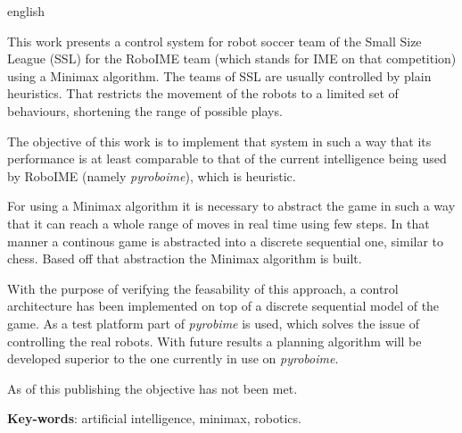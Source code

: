 \begin{resumo}[Abstract]
  \begin{otherlanguage*}{english}

    This work presents a control system for robot soccer team of the Small Size
    League (SSL) for the RoboIME team (which stands for IME on that competition)
    using a Minimax algorithm. The teams of SSL are usually controlled by plain
    heuristics. That restricts the movement of the robots to a limited set of
    behaviours, shortening the range of possible plays.

    The objective of this work is to implement that system in such a way that
    its performance is at least comparable to that of the current intelligence
    being used by RoboIME (namely \textit{pyroboime}), which is heuristic.

    For using a Minimax algorithm it is necessary to abstract the game in such a
    way that it can reach a whole range of moves in real time using few steps.
    In that manner a continous game is abstracted into a discrete sequential
    one, similar to chess. Based off that abstraction the Minimax algorithm is
    built.

    With the purpose of verifying the feasability of this approach, a control
    architecture has been implemented on top of a discrete sequential model of
    the game. As a test platform part of \textit{pyrobime} is used, which solves
    the issue of controlling the real robots. With future results a planning
    algorithm will be developed superior to the one currently in use on
    \textit{pyroboime}.

    As of this publishing the objective has not been met.

    \textbf{Key-words}: artificial intelligence, minimax, robotics.
  \end{otherlanguage*}
\end{resumo}


































